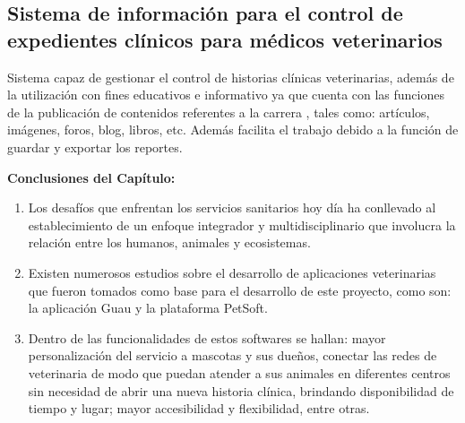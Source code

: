 \subsection{Sistema de información para el control de expedientes clínicos para médicos veterinarios}

Sistema capaz de gestionar el control de historias 
clínicas veterinarias, además de la utilización con fines educativos e informativo ya que 
cuenta con las funciones de la publicación de contenidos referentes a la carrera , tales 
como: artículos, imágenes, foros, blog, libros, etc. Además facilita el trabajo debido a la 
función de guardar y exportar los reportes. 
\newline


\textbf{{\large Conclusiones del Capítulo:}}
\begin{enumerate}
	\item Los desafíos que enfrentan los servicios sanitarios hoy día ha 
	conllevado al establecimiento de un enfoque integrador y 
	multidisciplinario que involucra la relación entre los humanos, 
	animales y ecosistemas.
	\item Existen numerosos estudios sobre el desarrollo de aplicaciones 
	veterinarias que fueron tomados como base para el desarrollo de este 
	proyecto, como son: la aplicación Guau y la plataforma PetSoft.
	\item Dentro de las funcionalidades de estos softwares se hallan: mayor 
	personalización del servicio a mascotas y sus dueños, conectar las 
	redes de veterinaria de modo que puedan atender a sus animales en 
	diferentes centros sin necesidad de abrir una nueva historia clínica, 
	brindando disponibilidad de tiempo y lugar; mayor accesibilidad y 
	flexibilidad, entre otras.
\end{enumerate}



